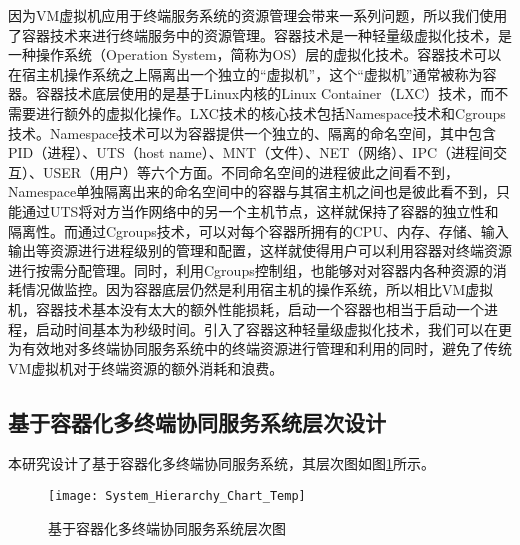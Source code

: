 因为VM虚拟机应用于终端服务系统的资源管理会带来一系列问题，所以我们使用了容器技术来进行终端服务中的资源管理。容器技术是一种轻量级虚拟化技术，是一种操作系统（Operation System，简称为OS）层的虚拟化技术。容器技术可以在宿主机操作系统之上隔离出一个独立的“虚拟机”，这个“虚拟机”通常被称为容器。容器技术底层使用的是基于Linux内核的Linux Container（LXC）技术，而不需要进行额外的虚拟化操作。LXC技术的核心技术包括Namespace技术和Cgroups技术。Namespace技术可以为容器提供一个独立的、隔离的命名空间，其中包含PID（进程）、UTS（host name）、MNT（文件）、NET（网络）、IPC（进程间交互）、USER（用户）等六个方面。不同命名空间的进程彼此之间看不到，Namespace单独隔离出来的命名空间中的容器与其宿主机之间也是彼此看不到，只能通过UTS将对方当作网络中的另一个主机节点，这样就保持了容器的独立性和隔离性。而通过Cgroups技术，可以对每个容器所拥有的CPU、内存、存储、输入输出等资源进行进程级别的管理和配置，这样就使得用户可以利用容器对终端资源进行按需分配管理。同时，利用Cgroups控制组，也能够对对容器内各种资源的消耗情况做监控。因为容器底层仍然是利用宿主机的操作系统，所以相比VM虚拟机，容器技术基本没有太大的额外性能损耗，启动一个容器也相当于启动一个进程，启动时间基本为秒级时间。引入了容器这种轻量级虚拟化技术，我们可以在更为有效地对多终端协同服务系统中的终端资源进行管理和利用的同时，避免了传统VM虚拟机对于终端资源的额外消耗和浪费。

\subsection{基于容器化多终端协同服务系统层次设计}
本研究设计了基于容器化多终端协同服务系统，其层次图如图\ref{fig:system_hierarchy}所示。
\begin{figure}[!htbp]
    \centering
    \texttt{[image: System\_Hierarchy\_Chart\_Temp]}
    \caption{基于容器化多终端协同服务系统层次图}
    \label{fig:system_hierarchy}
\end{figure}

